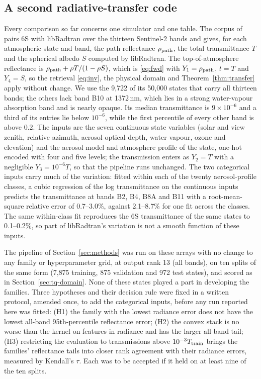 \subsection{A second radiative-transfer code}\label{sec:lrt}
Every comparison so far concerns one simulator and one table. The corpus of \cite{pkan} pairs 6S
\cite{vermote} with libRadtran \cite{mayer,emde} over the thirteen Sentinel-2 bands and gives, for each
atmospheric state and band, the path reflectance $\rho_{\rm path}$, the total transmittance $T$ and the
spherical albedo $S$ computed by libRadtran. The top-of-atmosphere reflectance is
$\rho_{\rm path}+\rho T/(1-\rho S)$, which is \eqref{eq:fwd} with $Y_1=\rho_{\rm path}$, $t=T$ and
$Y_4=S$, so the retrieval \eqref{eq:inv}, the physical domain and Theorem~\ref{thm:transfer} apply
without change. We use the 9{,}722 of its 50{,}000 states that carry all thirteen bands; the others lack
band B10 at 1372\,nm, which lies in a strong water-vapour absorption band and is nearly opaque. Its
median transmittance is $9\times10^{-6}$ and a third of its entries lie below $10^{-6}$, while the
first percentile of every other band is above $0.2$. The inputs are the seven continuous state
variables (solar and view zenith, relative azimuth, aerosol optical depth, water vapour, ozone and
elevation) and the aerosol model and atmosphere profile of the state, one-hot encoded with four and five
levels; the transmission enters as $Y_2=T$ with a negligible $Y_3=10^{-6}T$, so that the pipeline runs
unchanged. The two categorical inputs carry much of the variation: fitted within each of the twenty
aerosol-profile classes, a cubic regression of the log transmittance on the continuous inputs predicts
the transmittance at bands B2, B4, B8A and B11 with a root-mean-square relative error of 0.7--3.0\%,
against 2.1--8.7\% for one fit across the classes. The same within-class fit reproduces the 6S
transmittance of the same states to 0.1--0.2\%, so part of libRadtran's variation is not a smooth
function of these inputs.

The pipeline of Section~\ref{sec:methods} was run on these arrays with no change to any family or
hyperparameter grid, at output rank 13 (all bands), on ten splits of the same form (7{,}875 training,
875 validation and 972 test states), and scored as in Section~\ref{sec:tq-domain}. None of these states
played a part in developing the families. Three hypotheses and their decision rule were fixed in a
written protocol, amended once, to add the categorical inputs, before any run reported here was
fitted: (H1) the family with the lowest radiance error does not have the
lowest all-band 95th-percentile reflectance error; (H2) the convex stack is no worse than the kernel on
features in radiance and has the larger all-band tail; (H3) restricting the evaluation to
transmissions above $10^{-3}T_{\rm train}$ brings the families' reflectance tails into closer rank
agreement with their radiance errors, measured by Kendall's $\tau$. Each was to be accepted if it held
on at least nine of the ten splits.

